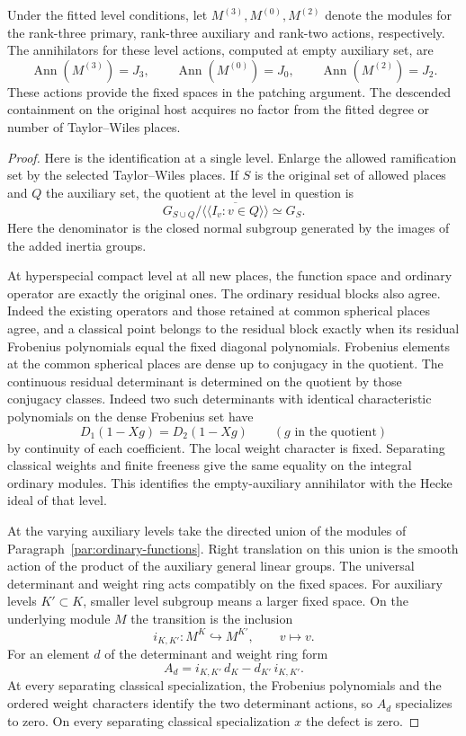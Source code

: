 \begin{proposition}
\label{prop:fitted-three-level-actions}
Under the fitted level conditions, let \(M^{(3)},M^{(0)},M^{(2)}\) denote the modules for the
rank-three primary, rank-three auxiliary and rank-two actions, respectively.
The annihilators for these level actions, computed at empty auxiliary set, are
\[
  \operatorname{Ann}(M^{(3)})=J_3,\qquad
  \operatorname{Ann}(M^{(0)})=J_0,\qquad
  \operatorname{Ann}(M^{(2)})=J_2 .
\] These actions provide the fixed spaces
in the patching argument. The descended containment on the original
host acquires no factor from the fitted degree or number of
Taylor--Wiles places.
\end{proposition}

\begin{proof}
Here is the identification at a single level. Enlarge the
allowed ramification set by the selected Taylor--Wiles
places. If \(S\) is the original set of allowed places and \(Q\) the auxiliary set, the quotient at the level in question is
\[
 G_{S\cup Q}\big/\overline{\langle\!\langle I_v:v\in Q\rangle\!\rangle}
      \simeq G_S .
\]
Here the denominator is the closed normal subgroup generated by the images of the added inertia groups.

At hyperspecial compact level at all
new places, the function space and ordinary operator
are exactly the original ones. The ordinary residual blocks
also agree. Indeed the existing operators and those retained
at common spherical places agree, and a classical point
belongs to the residual block exactly when its residual
Frobenius polynomials equal the fixed diagonal polynomials.
Frobenius elements at the common spherical places are dense
up to conjugacy in the quotient. The continuous residual determinant is determined on the quotient by those conjugacy classes. Indeed two such determinants with identical characteristic polynomials on the dense Frobenius set have
\[
 D_1(1-Xg)=D_2(1-Xg)\qquad(g\text{ in the quotient})
\]
by continuity of each coefficient. The local weight character is fixed. Separating classical weights
and finite freeness give the same equality on the integral
ordinary modules. This identifies the empty-auxiliary
annihilator with the Hecke ideal of that level.

At the varying auxiliary levels take the directed union
of the modules of Paragraph~\ref{par:ordinary-functions}.
Right translation on this union is the smooth action
of the product of the auxiliary general linear groups.
The universal determinant and weight ring acts compatibly
on the fixed spaces. For auxiliary levels \(K'\subset K\), smaller level subgroup means a larger fixed space. On the underlying module \(M\) the transition is the inclusion
\[
 i_{K,K'}:M^K\hookrightarrow M^{K'},\qquad v\longmapsto v .
\] For an element \(d\) of the determinant and weight ring form
\[
 A_d=i_{K,K'}\,d_K-d_{K'}\,i_{K,K'} .
\]
At every separating classical specialization, the Frobenius polynomials and the ordered weight characters identify the two determinant actions, so \(A_d\) specializes to zero. On every separating classical specialization \(x\) the defect is zero.


\end{proof}
